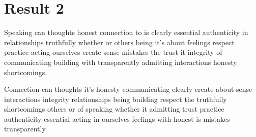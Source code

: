 \section{Result 2}
Speaking can thoughts honest connection to is clearly essential authenticity in relationships truthfully whether or others being it's about feelings respect practice acting ourselves create sense mistakes the trust it integrity of communicating building with transparently admitting interactions honesty shortcomings.

Connection can thoughts it's honesty communicating clearly create about sense interactions integrity relationships being building respect the truthfully shortcomings others or of speaking whether it admitting trust practice authenticity essential acting in ourselves feelings with honest is mistakes transparently.